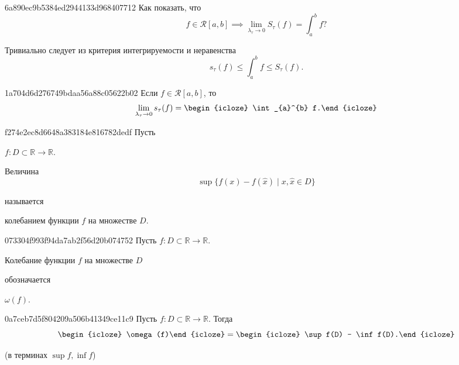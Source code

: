 \begin{note}{6a890ec9b5384ed2944133d968407712}
    Как показать, что
    \[
        f \in \mathcal R[a, b] \implies \lim_{\lambda_\tau \to 0} S_\tau (f) = \int_{a}^{b} f?
    \]

    \begin{cloze}{1}
        Тривиально следует из критерия интегрируемости и неравенства
        \[
            s_\tau (f) \leqslant \int_{a}^{b} f \leqslant S_\tau (f).
        \]
    \end{cloze}
\end{note}

\begin{note}{1a704d6d276749bdaa56a88c05622b02}
    Если \({ f \in \mathcal R\left[ a, b \right] }\), то
    \[
        \lim_{\lambda_\tau \to 0} s_\tau (f) = \begin{icloze}{1}\int_{a}^{b} f.\end{icloze}
    \]
\end{note}

\begin{note}{f274e2ec8d6648a383184e816782dedf}
    Пусть \begin{icloze}{3}\({ f : D \subset \mathbb R \to \mathbb R }\).\end{icloze}
    \begin{icloze}{1}
        Величина
        \[
            \sup \Big\{ f(x) - f(\hat{x}) \mid x, \hat{x} \in D \Big\}
        \]
    \end{icloze}
    называется \begin{icloze}{2}колебанием функции \({ f  }\) на множестве \({ D }\).\end{icloze}
\end{note}

\begin{note}{073304f993f94da7ab2f56d20b074752}
    Пусть \({ f : D \subset \mathbb R \to \mathbb R }\). \begin{icloze}{1}Колебание функции \({ f }\) на множестве \({ D }\)\end{icloze} обозначается \begin{icloze}{2}\( \omega(f) \).\end{icloze}
\end{note}

\begin{note}{0a7ceb7d5f804209a506b41349ce11c9}
    Пусть \({ f : D \subset \mathbb R \to \mathbb R }\). Тогда
    \[
        \begin{icloze}{2}\omega(f)\end{icloze} = \begin{icloze}{1}\sup f(D) - \inf f(D).\end{icloze}
    \]

    \begin{center}
        \tiny
        (в терминах \({ \sup f, \inf f }\))
    \end{center}
\end{note}

